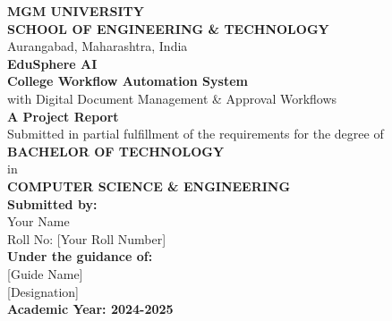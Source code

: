 \begin{titlepage}
    \centering
    \vspace*{1cm}
    
    
    {\LARGE \textbf{MGM UNIVERSITY}}\\[0.5cm]
    {\Large \textbf{SCHOOL OF ENGINEERING \& TECHNOLOGY}}\\[0.3cm]
    {\large Aurangabad, Maharashtra, India}\\[2cm]
    
    {\huge \textbf{EduSphere AI}}\\[0.5cm]
    {\LARGE \textbf{College Workflow Automation System}}\\[0.5cm]
    {\large with Digital Document Management \& Approval Workflows}\\[2cm]
    
    {\Large \textbf{A Project Report}}\\[0.3cm]
    {\large Submitted in partial fulfillment of the requirements for the degree of}\\[0.5cm]
    {\Large \textbf{BACHELOR OF TECHNOLOGY}}\\[0.3cm]
    {\large in}\\[0.3cm]
    {\Large \textbf{COMPUTER SCIENCE \& ENGINEERING}}\\[2cm]
    
    {\large \textbf{Submitted by:}}\\[0.3cm]
    {\large Your Name}\\
    {\large Roll No: [Your Roll Number]}\\[1cm]
    
    {\large \textbf{Under the guidance of:}}\\[0.3cm]
    {\large [Guide Name]}\\
    {\large [Designation]}\\[1.5cm]
    
    {\large \textbf{Academic Year: 2024-2025}}\\[0.3cm]
    
    \vfill
\end{titlepage}

\newpage
